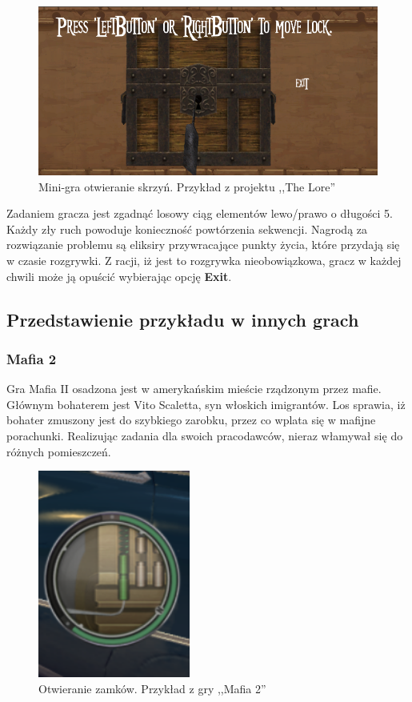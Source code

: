 \documentclass[oneside,polski,logo]{amuthesis}
\begin{document}
\begin{figure}[h]
	\centering
	\includegraphics[width=12cm]{images/tyrek/minigraskrzynia.png}
	\caption{Mini-gra otwieranie skrzyń. Przykład z projektu ,,The Lore''}
\end{figure}

Zadaniem gracza jest zgadnąć losowy ciąg elementów lewo/prawo o długości 5. Każdy zły ruch powoduje konieczność powtórzenia sekwencji. Nagrodą za rozwiązanie problemu są eliksiry przywracające punkty życia, które przydają się w czasie rozgrywki. Z racji, iż jest to rozgrywka nieobowiązkowa, gracz w każdej chwili może ją opuścić wybierając opcję \textbf{Exit}.
\subsection{Przedstawienie przykładu w innych grach}
\subsubsection{Mafia 2}
\par Gra Mafia II osadzona jest w amerykańskim mieście rządzonym przez mafie. Głównym bohaterem jest Vito Scaletta, syn włoskich imigrantów. Los sprawia, iż bohater zmuszony jest do szybkiego zarobku, przez co wplata się w mafijne porachunki. Realizując zadania dla swoich pracodawców, nieraz włamywał się do różnych pomieszczeń. 

\begin{figure}[h!]
	\centering
	\includegraphics[width=5cm]{images/tyrek/Mafia2.png}
	\caption{Otwieranie zamków. Przykład z gry ,,Mafia 2''}
\end{figure}
\end{document}
